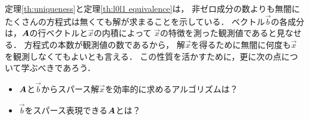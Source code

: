 定理\ref{th:uniqueness}と定理\ref{th:l0l1 equivalence}は，
非ゼロ成分の数よりも無闇にたくさんの方程式は無くても解が求まることを示している．
ベクトル$\vec b$の各成分は，$\mbox{\boldmath $A$}$の行ベクトルと$\vec x$の内積によって
$\vec x$の特徴を測った観測値であると見なせる．
方程式の本数が観測値の数であるから，
解$\vec x$を得るために無闇に何度も$\vec x$を観測しなくてもよいとも言える．
この性質を活かすために，更に次の点について学ぶべきであろう．
\begin{itemize}
 \item $\mbox{\boldmath $A$}$と$\vec b$からスパース解$\vec x$を効率的に求めるアルゴリズムは？
 \item $\vec b$をスパース表現できる$\mbox{\boldmath $A$}$とは？
\end{itemize}










